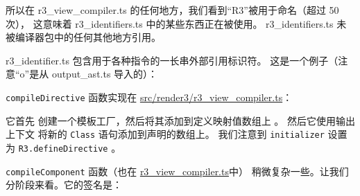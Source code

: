 


所以在 r3\_view\_compiler.ts 的任何地方，我们看到“R3”被用于命名（超过 50 次），
这意味着 r3\_identifiers.ts 中的某些东西正在被使用。
r3\_identifiers.ts 未被编译器包中的任何其他地方引用。


r3\_identifier.ts 包含用于各种指令的一长串外部引用标识符。
这是一个例子（注意“o”是从 output\_ast.ts 导入的）：




\texttt{compileDirective} 函数实现在
\href{https://github.com/angular/angular/blob/master/packages/compiler/src/render3/r3_view_compiler.ts}
{src/render3/r3\_view\_compiler.ts}：




它首先  创建一个模板工厂，然后将其添加到定义映射值数组上 。
然后它使用输出上下文  将新的 \texttt{Class} 语句添加到声明的数组上。
我们注意到 \texttt{initializer} 设置为 \texttt{R3.defineDirective} 。


\texttt{compileComponent} 函数（也在
\href{https://github.com/angular/angular/blob/master/packages/compiler/src/render3/r3_view_compiler.ts}
{r3\_view\_compiler.ts}中）
稍微复杂一些。让我们分阶段来看。它的签名是：

